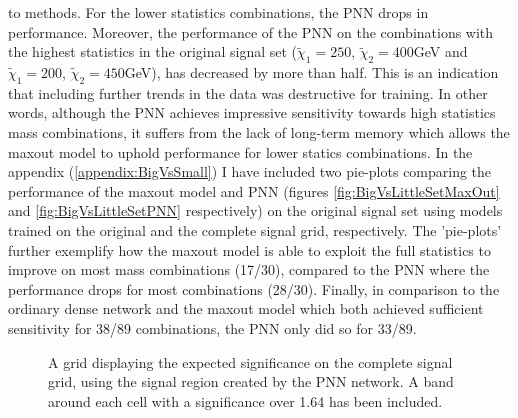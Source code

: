 to methods. For the lower statistics combinations, the \ac{PNN} drops in performance. Moreover, the performance of the \ac{PNN} on the combinations with the highest 
statistics in the original signal set ($\tilde{\chi}_1=250$, $\tilde{\chi}_2=400$GeV and $\tilde{\chi}_1=200$, $\tilde{\chi}_2=450$GeV), has decreased by more than half.
This is an indication that including further trends in the data was destructive for training. In other words, although the \ac{PNN} achieves impressive sensitivity towards high 
statistics mass combinations, it suffers from the lack of long-term memory which allows the maxout model to uphold performance for lower statics combinations. In the appendix 
(\ref{appendix:BigVsSmall}) I have included two pie-plots comparing the performance of the maxout model and \ac{PNN} (figures \ref{fig:BigVsLittleSetMaxOut} and \ref{fig:BigVsLittleSetPNN} 
respectively) on the original signal set using models trained on the original and the complete signal grid, respectively. The 'pie-plots' further exemplify how the maxout model is able to exploit 
the full statistics to improve on most mass combinations (17/30), compared to the \ac{PNN} where the performance drops for most combinations (28/30). Finally, in comparison to the ordinary 
dense network and the maxout model which both achieved sufficient sensitivity for 38/89 combinations, the \ac{PNN} only did so for 33/89.\\
\begin{figure}
    \caption{A grid displaying the expected significance on the complete signal grid, using the signal region 
    created by the \acs{PNN} network. A band around each cell with a significance over 1.64 has been included.}
    \label{fig:PNNPCA_FS_MLMGridSig}
\end{figure}
